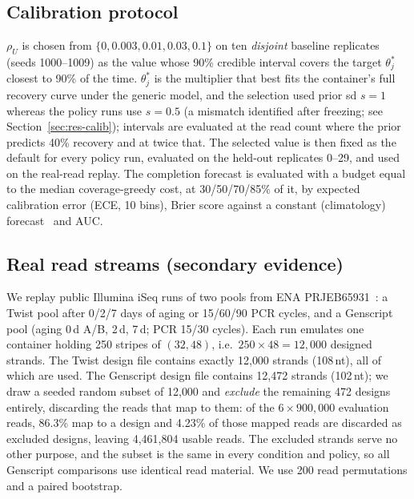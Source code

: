 \documentclass[conference,onecolumn,11pt]{IEEEtran}
\begin{document}
\subsection{Calibration protocol}\label{sec:calib-protocol}
$\rho_U$ is chosen from $\{0, 0.003, 0.01, 0.03, 0.1\}$ on ten \emph{disjoint} baseline
replicates (seeds 1000--1009) as the value whose 90\% credible interval covers the target
$\theta^\ast_j$ closest to 90\% of the time.  $\theta^\ast_j$ is the multiplier that best fits the
container's full recovery curve under the generic model, and the selection used prior sd $s{=}1$
whereas the policy runs use $s{=}0.5$ (a mismatch identified after freezing; see
Section~\ref{sec:res-calib}); intervals are evaluated at the read
count where the prior predicts 40\% recovery and at twice that.  The selected value is then fixed
as the default for every policy run, evaluated on the held-out replicates 0--29, and used on
the real-read replay.  The completion forecast is evaluated with a budget equal to the median
coverage-greedy cost, at 30/50/70/85\% of it, by expected calibration error (ECE, 10 bins), Brier
score against a constant (climatology) forecast~\cite{gneiting2007strictly} and AUC.

\subsection{Real read streams (secondary evidence)}
We replay public Illumina iSeq runs of two pools from ENA PRJEB65931~\cite{gimpel2023digital,gimpel2023prjeb65931}:
a Twist pool after 0/2/7 days of aging or 15/60/90 PCR cycles, and a Genscript pool (aging 0\,d A/B,
2\,d, 7\,d; PCR 15/30 cycles).  Each run emulates one container holding 250 stripes of $(32,48)$,
i.e.\ $250\times48=12{,}000$ designed strands.  The Twist design file contains exactly 12{,}000
strands (108\,nt), all of which are used.  The Genscript design file contains 12{,}472 strands
(102\,nt); we draw a seeded random subset of 12{,}000 and \emph{exclude} the remaining 472 designs
entirely, discarding the reads that map to them: of the $6\times900{,}000$ evaluation reads, 86.3\%
map to a design and 4.23\% of those mapped reads are discarded as excluded designs, leaving
4{,}461{,}804 usable reads.  The excluded strands serve no other purpose, and the subset is the same
in every condition and policy, so all Genscript comparisons use identical read material.  We use 200
read permutations and a paired bootstrap.
\end{document}
